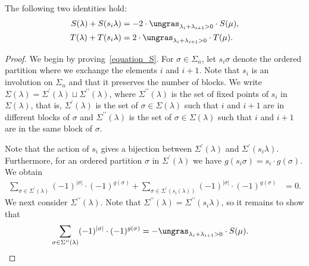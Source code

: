 \begin{prop}
The following two identities hold:
\begin{align}
S(\lambda) + S(s_{i}\lambda)
& =
-2 \cdot \ungras_{\lambda_{i}+\lambda_{i+1}>0}\cdot S(\mu) ,
\label{equation_S} \\
T(\lambda) + T(s_{i}\lambda)
& =
2 \cdot \ungras_{\lambda_{i}+\lambda_{i+1}>0}\cdot T(\mu) .
\label{equation_T}
\end{align}
\label{proposition_S_equal_T}
\end{prop}
\begin{proof}
We begin by proving~\eqref{equation_S}.
For $\sigma \in \Sigma_{n}$, let $s_{i}\sigma$ denote the
ordered partition where we exchange the elements $i$ and $i+1$.
Note that $s_{i}$ is an involution on $\Sigma_{n}$
and that it preserves the number of blocks.
We write
$\Sigma(\lambda) =\Sigma^{\prime}(\lambda) \sqcup \Sigma^{\prime\prime}(\lambda)$,
where $\Sigma^{\prime\prime}(\lambda)$ is the set of fixed points of $s_{i}$
in~$\Sigma(\lambda)$,
that is, 
$\Sigma^{\prime}(\lambda)$ is the set of $\sigma\in\Sigma(\lambda)$
such that $i$ and $i+1$ are in different blocks of $\sigma$
and
$\Sigma^{\prime\prime}(\lambda)$ is the set of $\sigma\in\Sigma(\lambda)$
such that $i$ and $i+1$ are in the same block of $\sigma$.



Note that the action of $s_{i}$ gives a bijection between
$\Sigma^{\prime}(\lambda)$ and $\Sigma^{\prime}(s_{i} \lambda)$.
Furthermore, for an ordered partition $\sigma$ in $\Sigma^{\prime}(\lambda)$
we have
$g(s_{i}\sigma) = s_{i}\cdot g(\sigma)$.
We obtain
\begin{align}
\sum_{\sigma \in \Sigma^{\prime}(\lambda)}
(-1)^{|\sigma|} \cdot (-1)^{g(\sigma)}
+
\sum_{\sigma \in \Sigma^{\prime}(s_{i}(\lambda))}
(-1)^{|\sigma|} \cdot (-1)^{g(\sigma)}
& = 0 
.
\label{equation_Sigma_prime}
\end{align}
We next consider $\Sigma^{\prime\prime}(\lambda)$.
Note that $\Sigma^{\prime\prime}(\lambda) =\Sigma^{\prime\prime}(s_{i}\lambda)$, so 
it remains to show that
\begin{align}
\sum_{\sigma\in\Sigma^{\prime\prime}(\lambda)}
(-1)^{|\sigma|} \cdot (-1)^{g(\sigma)}
& =
-\ungras_{\lambda_{i}+\lambda_{i+1}>0}\cdot S(\mu).
\label{equation_Sigma_prime_prime}
\end{align}



\end{proof}
